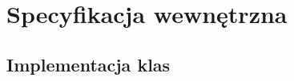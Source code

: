 \documentclass[a4paper,twoside,12pt]{book}
\begin{document}
\chapter{Specyfikacja wewnętrzna}
\label{ch:05}







      

\section{Implementacja klas}
\end{document}
